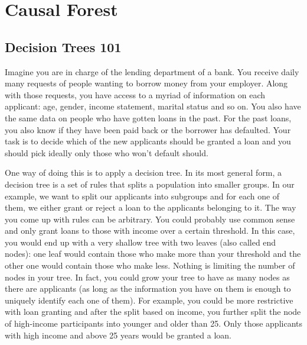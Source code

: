 \section{Causal Forest}

\subsection{Decision Trees 101}

Imagine you are in charge of the lending department of a bank. You receive daily many requests of people wanting to borrow money from your employer. Along with those requests, you have access to a myriad of information on each applicant: age, gender, income statement, marital status and so on. You also have the same data on people who have gotten loans in the past. For the past loans, you also know if they have been paid back or the borrower has defaulted. Your task is to decide which of the new applicants should be granted a loan and you should pick ideally only those who won't default should.

One way of doing this is to apply a decision tree. In its most general form, a decision tree is a set of rules that splits a population into smaller groups. In our example, we want to split our applicants into subgroups and for each one of them, we either grant or reject a loan to the applicants belonging to it. The way you come up with rules can be arbitrary. You could probably use common sense and only grant loans to those with income over a certain threshold. In this case, you would end up with a very shallow tree with two leaves (also called end nodes): one leaf would contain those who make more than your threshold and the other one would contain those who make less. Nothing is limiting the number of nodes in your tree. In fact, you could grow your tree to have as many nodes as there are applicants (as long as the information you have on them is enough to uniquely identify each one of them). For example, you could be more restrictive with loan granting and after the split based on income, you further split the node of high-income participants into younger and older than 25. Only those applicants with high income and above 25 years would be granted a loan.

